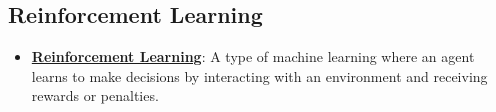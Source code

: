 \documentclass{article}%
\begin{document}
%
\subsection{Reinforcement Learning}%
\label{subsec:ReinforcementLearning}%
\begin{itemize}[leftmargin=*]%
\item \href{https://purdue.brightspace.com/d2l/common/assets/pdfjs-d2l-dist/1.0.14-legacy/web/viewer.html?file=\%2Fcontent\%2Fenforced\%2F1095467-wl.202510.CS.24300.001\%2F02L2-Intro.pdf\%3Fou\%3D1095467\&lang=en-us\&container=d2l-fileviewer-rendered-pdf\&fullscreen=d2l-fileviewer-rendered-pdf-dialog\&height=667#page=46}{\textbf{Reinforcement Learning}}: A type of machine learning where an agent learns to make decisions by interacting with an environment and receiving rewards or penalties.%
\end{itemize}

%
\end{document}
